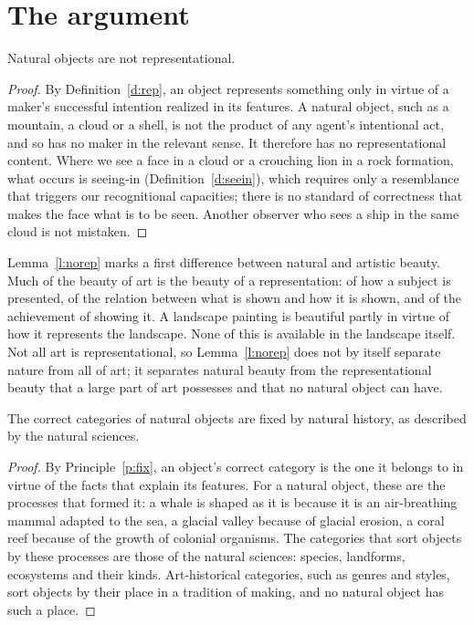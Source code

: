 \documentclass{situationist-preprint}
\begin{document}
\section{The argument}

\begin{lemma}\label{l:norep}
Natural objects are not representational.
\end{lemma}

\begin{proof}
By Definition~\ref{d:rep}, an object represents something only in virtue of a maker's successful intention realized in its features. A natural object, such as a mountain, a cloud or a shell, is not the product of any agent's intentional act, and so has no maker in the relevant sense. It therefore has no representational content. Where we see a face in a cloud or a crouching lion in a rock formation, what occurs is seeing-in (Definition~\ref{d:seein}), which requires only a resemblance that triggers our recognitional capacities; there is no standard of correctness that makes the face what is to be seen. Another observer who sees a ship in the same cloud is not mistaken.
\end{proof}

Lemma~\ref{l:norep} marks a first difference between natural and artistic beauty. Much of the beauty of art is the beauty of a representation: of how a subject is presented, of the relation between what is shown and how it is shown, and of the achievement of showing it. A landscape painting is beautiful partly in virtue of how it represents the landscape. None of this is available in the landscape itself. Not all art is representational, so Lemma~\ref{l:norep} does not by itself separate nature from all of art; it separates natural beauty from the representational beauty that a large part of art possesses and that no natural object can have.

\begin{lemma}\label{l:cat}
The correct categories of natural objects are fixed by natural history, as described by the natural sciences.
\end{lemma}

\begin{proof}
By Principle~\ref{p:fix}, an object's correct category is the one it belongs to in virtue of the facts that explain its features. For a natural object, these are the processes that formed it: a whale is shaped as it is because it is an air-breathing mammal adapted to the sea, a glacial valley because of glacial erosion, a coral reef because of the growth of colonial organisms. The categories that sort objects by these processes are those of the natural sciences: species, landforms, ecosystems and their kinds. Art-historical categories, such as genres and styles, sort objects by their place in a tradition of making, and no natural object has such a place.
\end{proof}
\end{document}
